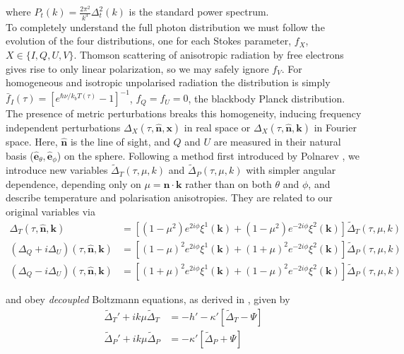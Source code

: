 \documentclass[a4paper,10pt]{article}
\renewcommand{\v}[1]{\mathbf{#1}}
\newcommand{\unit}[1]{\hat{\v{#1}}}
\begin{document}
where $P_t(k) = \frac{2\pi^2}{k^3}\Delta_t^2(k)$ is the standard power spectrum.\\

To completely understand the full photon distribution we must follow the evolution of the four distributions, one for each Stokes parameter, $f_X$, $X\in\{I,Q,U,V\}$. Thomson scattering of anisotropic radiation by free electrons gives rise to only linear polarization, so we may safely ignore $f_V$. For homogeneous and isotropic unpolarised radiation the distribution is simply $\bar{f}_I(\tau)= [e^{\hbar \nu/k_b T(\tau)}-1]^{-1}$, $f_Q=f_U=0$, the blackbody Planck distribution. The presence of metric perturbations breaks this homogeneity, inducing frequency independent perturbations $\Delta_X(\tau,\unit{n},\v{x})$ in real space or $\Delta_X(\tau,\unit{n},\v{k})$ in Fourier space. Here, $\unit{n}$ is the line of sight, and $Q$ and $U$ are measured in their natural basis ($\unit{e}_\theta, \unit{e}_\phi$) on the sphere. Following a method first introduced by Polnarev \cite{polnarev}, we introduce new variables $\tilde{\Delta}_T(\tau,\mu,k)$ and $\tilde{\Delta}_P(\tau,\mu,k)$ with simpler angular dependence, depending only on $\mu=\unit{n}\cdot\v{k}$ rather than on both $\theta$  and $\phi$, and describe temperature and polarisation anisotropies. They are related to our original variables via
\begin{equation}\begin{split}
\Delta_T(\tau,\unit{n},\v{k}) &= [(1-\mu^2) e^{2i\phi} \xi^1(\v{k})+(1-\mu^2) e^{-2i\phi} \xi^2(\v{k})]\tilde{\Delta}_T(\tau,\mu,k)\\
(\Delta_Q+i\Delta_U)(\tau,\unit{n},\v{k}) &=[(1-\mu)^2 e^{2i\phi} \xi^1(\v{k})+(1+\mu)^2 e^{-2i\phi} \xi^2(\v{k})]\tilde{\Delta}_P(\tau,\mu,k) \\
(\Delta_Q-i\Delta_U)(\tau,\unit{n},\v{k}) &=[(1+\mu)^2 e^{2i\phi} \xi^1(\v{k})+(1-\mu)^2 e^{-2i\phi} \xi^2(\v{k})]\tilde{\Delta}_P(\tau,\mu,k)
\end{split}\end{equation}

and obey \textit{decoupled} Boltzmann equations, as derived in \cite{kowosky}, given by
\begin{equation}\begin{split}
\tilde{\Delta}_T'+ik\mu \tilde{\Delta}_T &= -h' -\kappa'[\tilde{\Delta}_T - \Psi]\\
\tilde{\Delta}_P'+ik\mu\tilde{\Delta}_P &= -\kappa'[\tilde{\Delta}_P + \Psi]
\end{split}
\label{Boltzmann}\end{equation}
\end{document}
